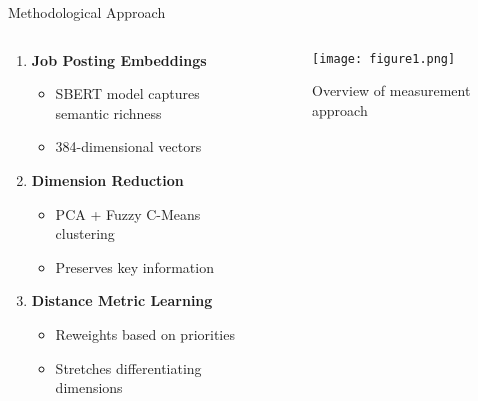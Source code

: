 \documentclass{beamer}
\begin{document}
\begin{frame}{Methodological Approach}
\begin{columns}
\begin{column}{0.5\textwidth}
\begin{enumerate}
    \item \textbf{Job Posting Embeddings}
    \begin{itemize}
        \item SBERT model captures semantic richness
        \item 384-dimensional vectors
    \end{itemize}
    \item \textbf{Dimension Reduction}
    \begin{itemize}
        \item PCA + Fuzzy C-Means clustering
        \item Preserves key information
    \end{itemize}
    \item \textbf{Distance Metric Learning}
    \begin{itemize}
        \item Reweights based on priorities
        \item Stretches differentiating dimensions
    \end{itemize}
\end{enumerate}
\end{column}
\begin{column}{0.5\textwidth}
\begin{figure}
\centering
\texttt{[image: figure1.png]}
\caption*{Overview of measurement approach}
\end{figure}
\end{column}
\end{columns}
\end{frame}
\end{document}
